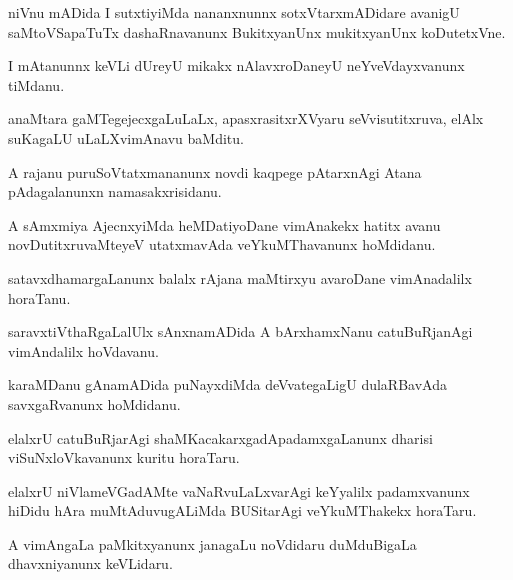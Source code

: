 \documentclass{article}
\begin{document}
\begin{mn}%
niVnu mADida I sutxtiyiMda nananxnunnx sotxVtarxmADidare avanigU saMtoVSapaTuTx 
dashaRnavanunx BukitxyanUnx mukitxyanUnx koDutetxVne.
\end{mn}

\begin{mn}%
I mAtanunnx keVLi dUreyU mikakx nAlavxroDaneyU neYveVdayxvanunx tiMdanu.
\end{mn}

\begin{mn}%
anaMtara gaMTegejecxgaLuLaLx, apasxrasitxrXVyaru seVvisutitxruva, elAlx suKagaLU 
uLaLXvimAnavu baMditu.
\end{mn}

\begin{mn}%
A rajanu puruSoVtatxmananunx novdi kaqpege pAtarxnAgi Atana pAdagalanunxn namasakxrisidanu.
\end{mn}

\begin{mn}%
A sAmxmiya AjecnxyiMda heMDatiyoDane vimAnakekx hatitx avanu novDutitxruvaMteyeV 
utatxmavAda veYkuMThavanunx hoMdidanu.
\end{mn}

\begin{mn}%
satavxdhamargaLanunx balalx rAjana maMtirxyu avaroDane vimAnadalilx horaTanu.
\end{mn}

\begin{mn}%
saravxtiVthaRgaLalUlx sAnxnamADida A bArxhamxNanu catuBuRjanAgi vimAndalilx hoVdavanu.
\end{mn}

\begin{mn}%
karaMDanu gAnamADida puNayxdiMda deVvategaLigU dulaRBavAda savxgaRvanunx hoMdidanu.
\end{mn}

\begin{mn}%
elalxrU catuBuRjarAgi shaMKacakarxgadApadamxgaLanunx dharisi viSuNxloVkavanunx kuritu 
horaTaru. 
\end{mn}

\begin{mn}%
elalxrU niVlameVGadAMte vaNaRvuLaLxvarAgi keYyalilx padamxvanunx hiDidu hAra 
muMtAduvugALiMda BUSitarAgi veYkuMThakekx horaTaru.
\end{mn}

\begin{mn}%
A vimAngaLa paMkitxyanunx janagaLu noVdidaru duMduBigaLa dhavxniyanunx keVLidaru.
\end{mn}
\end{document}
